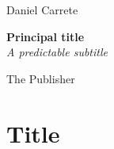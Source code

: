 \documentclass[a4paper,12pt]{book}
\newcommand*{\plogo}{\fbox{$\mathcal{PL}$}} %
\begin{document}

\begin{titlepage} %

	\raggedleft %
	
	\vspace*{\baselineskip} %
	
	
	{\Large Daniel Carrete} %
	
	\vspace*{0.167\textheight} %
	
	
	\textbf{\LARGE Principal title}\\[\baselineskip] %
	
	
	{\Large \textit{A predictable subtitle}} %
	
	\vfill %
	
	
	{\large The Publisher~~\plogo} %
	
	\vspace*{3\baselineskip} %
\end{titlepage}
\chapter[short]{Title}
\lipsum[2-4]
\end{document}
